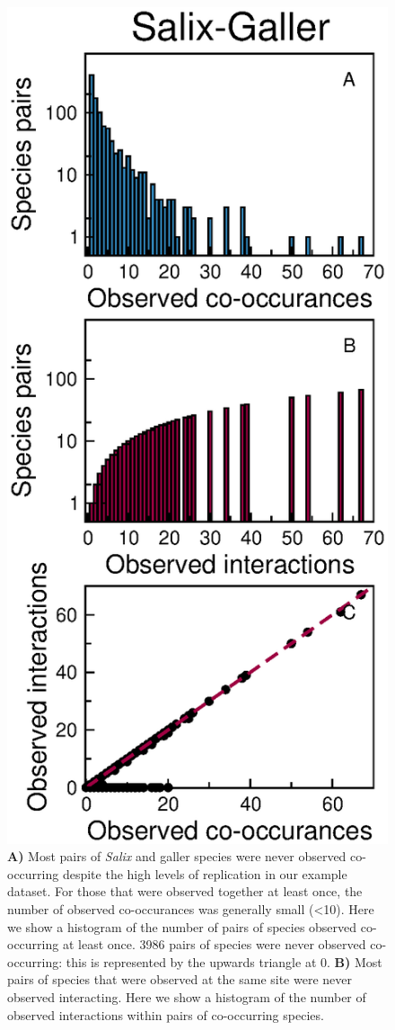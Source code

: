 \documentclass[12pt]{article}
\begin{document}
  \begin{figure}
    \caption{\textbf{A)} Most pairs of \emph{Salix} and galler species were never observed co-occurring despite the high levels of replication in our example dataset. For those that were observed together at least once, the number of observed co-occurances was generally small (\textless10). Here we show a histogram of the number of pairs of species observed co-occurring at least once. 3986 pairs of species were never observed co-occurring: this is represented by the upwards triangle at 0. \textbf{B)} Most pairs of species that were observed at the same site were never observed interacting. Here we show a histogram of the number of observed interactions within pairs of co-occurring species.}
    \label{histograms}
    \includegraphics*[width=.8\textwidth]{figures/Salix_Galler_histogram.eps}
    \end{figure}
\end{document}
